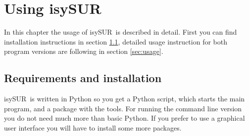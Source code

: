 \documentclass[11pt,fleqn]{book} %
\newcommand{\ProjectTitle}{isySUR}
\newcommand{\pt}{\ProjectTitle}
\begin{document}
\chapter{Using \ProjectTitle}
In this chapter the usage of \pt\ is described in detail. First you can find installation instructions in section \ref{sec:installation}, detailed usage instruction for both program versions are following in section \ref{sec:usage}.

\section{Requirements and installation}\label{sec:installation}
\pt\ is written in Python so you get a Python script, which starts the main program, and a package with the tools. For running the command line version you do not need much more than basic Python. If you prefer to use a graphical user interface you will have to install some more packages.
\end{document}

